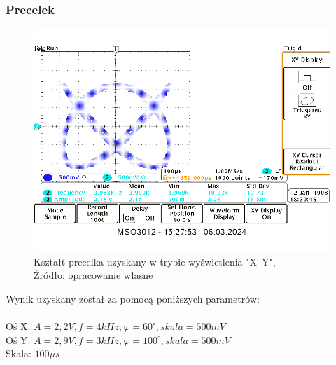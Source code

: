 \documentclass{article}
\begin{document}
        \subsubsection{Precelek}
        \begin{figure}[!ht]
          \begin{center}
              \includegraphics[scale=0.25]{grafiki/precelek.png}
              \caption{Kształt precelka uzyskany w trybie wyświetlenia "X--Y",\\Źródło: opracowanie własne}
          \end{center}
        \end{figure}
        Wynik uzyskany został za pomocą poniższych parametrów: \\ \\
        Oś X: $A = 2,2V,f = 4kHz, \varphi = 60^\circ, skala = 500mV$ \\
        Oś Y: $A = 2,9V,f = 3kHz, \varphi = 100^\circ, skala = 500mV$ \\
        Skala: $100 \mu s$

        \pagebreak
\end{document}
